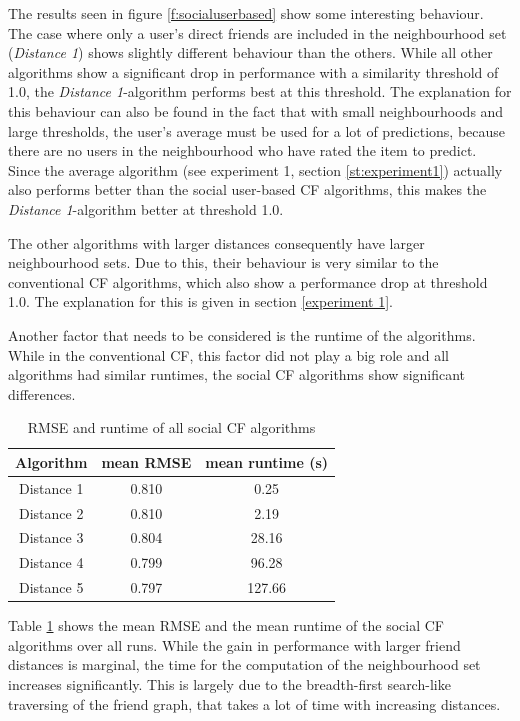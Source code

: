 The results seen in figure \ref{f:socialuserbased} show some interesting behaviour. The case where only a user's direct friends are included in the neighbourhood set (\textit{Distance 1}) shows slightly different behaviour than the others. While all other algorithms show a significant drop in performance with a similarity threshold of 1.0, the \textit{Distance 1}-algorithm performs best at this threshold. The explanation for this behaviour can also be found in the fact that with small neighbourhoods and large thresholds, the user's average must be used for a lot of predictions, because there are no users in the neighbourhood who have rated the item to predict. Since the average algorithm (see experiment 1, section \ref{st:experiment1}) actually also performs better than the social user-based CF algorithms, this makes the \textit{Distance 1}-algorithm better at threshold 1.0.

The other algorithms with larger distances consequently have larger neighbourhood sets. Due to this, their behaviour is very similar to the conventional CF algorithms, which also show a performance drop at threshold 1.0. The explanation for this is given in section \ref{experiment 1}.
\newline

Another factor that needs to be considered is the runtime of the algorithms. While in the conventional CF, this factor did not play a big role and all algorithms had similar runtimes, the social CF algorithms show significant differences.

\begin{table}[h]
	\begin{center}
	\begin{tabular}{ | c | c | c |}
	\hline
	Algorithm & mean RMSE & mean runtime (s) \\ \hline
	Distance 1 & 0.810 & 0.25 \\ \hline
	Distance 2 & 0.810 & 2.19 \\ \hline
	Distance 3 & 0.804 & 28.16 \\ \hline
	Distance 4 & 0.799 & 96.28 \\ \hline
	Distance 5 & 0.797 & 127.66 \\ \hline
	\end{tabular}
	\caption{RMSE and runtime of all social CF algorithms}
	\label{t:rmseruntimesocialcf}
	\end{center}
\end{table}

Table \ref{t:rmseruntimesocialcf} shows the mean RMSE and the mean runtime of the social CF algorithms over all runs. While the gain in performance with larger friend distances is marginal, the time for the computation of the neighbourhood set increases significantly. This is largely due to the breadth-first search-like traversing of the friend graph, that takes a lot of time with increasing distances.

